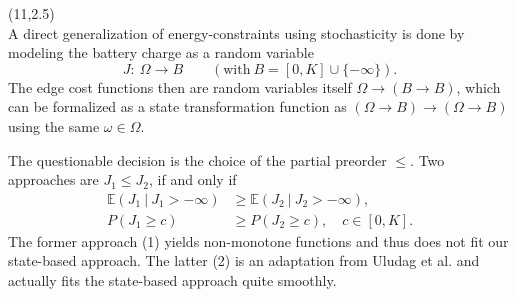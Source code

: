 \documentclass[a0,portrait]{a0poster}
\def\LHead#1{\noindent{\LARGE\color{oceangreen} #1}\smallskip}
\begin{document}
\begin{textblock}{4}(11,2.5)
\LHead{Stochasticity} \\
A direct generalization of energy-constraints using stochasticity is done
by modeling the battery charge as a random variable
\[J:\ \Omega \to B \qquad (\text{with}\ B = [0, K] \cup \{-\infty\}).\]
The edge cost functions then are random variables itself
$\Omega \to (B \to B)$, which can be formalized as a state transformation
function as $(\Omega \to B) \to (\Omega \to B)$ using the same $\omega \in \Omega$.

The questionable decision is the choice of the partial preorder $\leq$.
Two approaches are $J_1 \leq J_2$, if and only if
\begin{align}
\mathbb E(J_1\ |\ J_1 > -\infty) &\geq \mathbb E(J_2\ |\ J_2 > -\infty), \\
P(J_1 \geq c) &\geq P(J_2 \geq c), \quad c \in [0, K].
\end{align}
The former approach (1) yields non-monotone functions and thus does not fit
our state-based approach. The latter (2) is an adaptation from Uludag et al. \cite{Uludag2009}
and actually fits the state-based approach quite smoothly.
\end{textblock}
\end{document}

